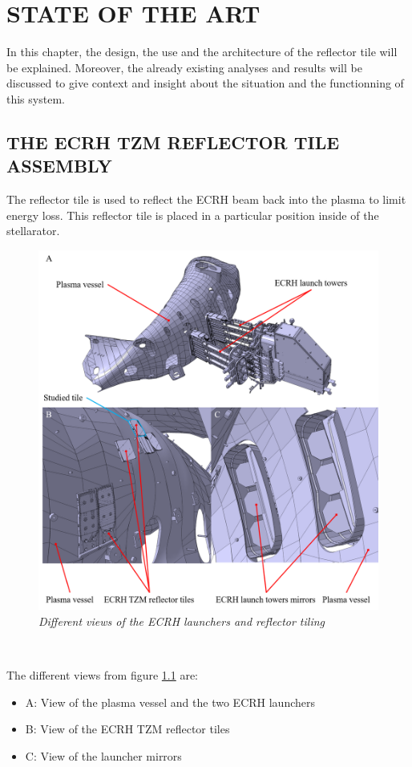 \chapter{STATE OF THE ART}
\normalsize{In this chapter, the design, the use and the architecture of the reflector tile will be explained. Moreover, the already existing analyses and results will be discussed to give context and insight about the situation and the functionning of this system.}
\section{THE \acrshort{ECRH} \acrshort{TZM} REFLECTOR TILE ASSEMBLY}
\normalsize{The reflector tile is used to reflect the \acrshort{ECRH} beam back into the plasma to limit energy loss. This reflector tile is placed in a particular position inside of the stellarator.}
\begin{figure}[h!]
    \centering
    \includegraphics[width=1\textwidth]{figures/ecrhposition2.png}
    \caption{\it Different views of the \acrshort{ECRH} launchers and reflector tiling}
    \label{fig:fig_3_1}
\end{figure}
\\
\normalsize{The different views from figure \ref{fig:fig_3_1} are:
\begin{itemize}
    \item A: View of the plasma vessel and the two \acrshort{ECRH} launchers
    \item B: View of the \acrshort{ECRH} \acrshort{TZM} reflector tiles
    \item C: View of the launcher mirrors
\end{itemize}
}
